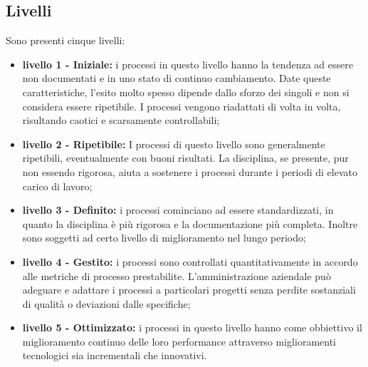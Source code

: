 \subsection{Livelli}
Sono presenti cinque livelli:
\begin{itemize}
\item \textbf{livello 1 - Iniziale:} i processi in questo livello hanno la tendenza ad essere non documentati e in uno stato di continuo cambiamento. Date queste caratteristiche, l'esito molto spesso dipende dallo sforzo dei singoli e non si considera essere ripetibile. I processi vengono riadattati di volta in volta, risultando caotici e scarsamente controllabili;

\item \textbf{livello 2 - Ripetibile:} I processi di questo livello sono generalmente ripetibili, eventualmente con buoni risultati. La disciplina, se presente, pur non essendo rigorosa, aiuta a sostenere i processi durante i periodi di elevato carico di lavoro;

\item \textbf{livello 3 - Definito:} i processi cominciano ad essere standardizzati, in quanto la disciplina è più rigorosa e la documentazione più completa. Inoltre sono soggetti ad certo livello di miglioramento nel lungo periodo;

\item \textbf{livello 4 - Gestito:} i processi sono controllati quantitativamente in accordo alle metriche di processo prestabilite. L'amministrazione aziendale può adeguare e adattare i processi a particolari progetti senza perdite sostanziali di qualità o deviazioni dalle specifiche;

\item \textbf{livello 5 - Ottimizzato:} i processi in questo livello hanno come obbiettivo il miglioramento continuo delle loro performance attraverso miglioramenti tecnologici sia incrementali che innovativi.
\end{itemize}
